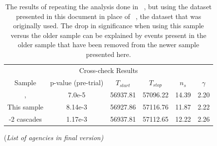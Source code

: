 \documentclass[aps,10pt,prd,twocolumn,floats,letterpaper,showpacs,nofootinbib,bibnotes,notitlepage,superscriptaddress,floatfix]{revtex4-1}
\newcommand{\MA}[1]{{\color{magenta}#1}}
\begin{document}
\begin{table}
\centering
\begin{ruledtabular}
\begin{tabular}{cccccc}
\multicolumn{6}{c}{Cross-check Results} \\[0.1cm]
Sample & p-value (pre-trial) & $T_{start}$ & $T_{stop}$ & $n_s$ & $\gamma$\\ 
\cite{IceCube:2018cha}, \cite{IceCube:2019} & 7.0e-5 & 56937.81 & 57096.22 & 14.39 & 2.20 \\
This sample & 8.14e-3 & 56927.86 & 57116.76 & 11.87 & 2.22 \\
\cite{IceCube:2018cha}-2 cascades & 1.17e-3 & 56937.81 & 57112.65 & 12.22 & 2.26 \\
\end{tabular}
\end{ruledtabular}
\caption[]{The results of repeating the analysis done in ~\cite{IceCube:2018cha}, but using the dataset presented in this document in place of ~\cite{IceCube:2019}, the dataset that was originally used. The drop in significance when using this sample versus the older sample can be explained by events present in the older sample that have been removed from the newer sample presented here.}\label{tab:TXSCrossChecks}
\end{table}

\begin{acknowledgements}
\begin{center}\MA{(\it List of agencies in final version)}\end{center}
%
\end{acknowledgements}




\end{document}
